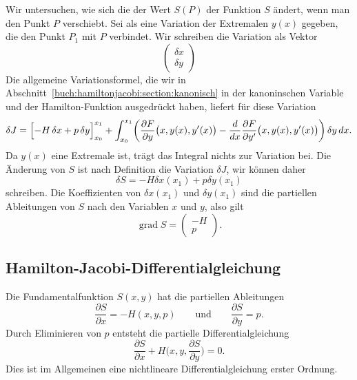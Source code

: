 Wir untersuchen, wie sich die der Wert $S(P)$ der Funktion $S$ ändert,
wenn man den Punkt $P$ verschiebt.
Sei als eine Variation der Extremalen $y(x)$ gegeben, die den Punkt $P_1$
mit $P$ verbindet.
Wir schreiben die Variation als Vektor
\[
\begin{pmatrix}
\delta x\\
\delta y
\end{pmatrix}
\]
Die allgemeine Variationsformel, die wir in 
Abschnitt~\ref{buch:hamiltonjacobi:section:kanonisch}
in der kanoninschen Variable und der Hamilton-Funktion ausgedrückt
haben, liefert für diese Variation
\[
\delta J
=
\Bigl[ -H\,\delta x + p \,\delta y \Bigr]_{x_0}^{x_1}
+
\int_{x_0}^{x_1}
\biggl(
\frac{\partial F}{\partial y}\bigl(x,y(x),y'(x)\bigr)
-
\frac{d}{dx}
\frac{\partial F}{\partial y'}\bigl(x,y(x),y'(x)\bigr)
\biggr)
\,
\delta y
\,dx.
\]
Da $y(x)$ eine Extremale ist, trägt das Integral nichts zur
Variation bei.
Die Änderung von $S$ ist nach Definition die Variation $\delta J$,
wir können daher
\[
\delta S
=
-H\delta x(x_1) + p\delta y(x_1)
\]
schreiben.
Die Koeffizienten von $\delta x(x_1)$ und $\delta y(x_1)$ sind die
partiellen Ableitungen von $S$ nach den Variablen $x$ und $y$, also
gilt
\[
\operatorname{grad} S
=
\begin{pmatrix}
-H\\
p
\end{pmatrix}.
\]

%
%
\subsection{Hamilton-Jacobi-Differentialgleichung
\label{buch:hamiltonjacobi:jacobi:subsection:HJ-DGL}}
Die Fundamentalfunktion $S(x,y)$ hat die partiellen Ableitungen
\begin{equation}
\frac{\partial S}{\partial x}
=
-H(x,y,p)
\qquad\text{und}\qquad
\frac{\partial S}{\partial y}
=
p.
\label{buch:hamiltonjacobi:jacobi:eqn:ableitungen}
\end{equation}
Durch Eliminieren von $p$ entsteht die partielle Differentialgleichung
\begin{equation}
\frac{\partial S}{\partial x}
+
H\biggl(x,y,\frac{\partial S}{\partial y}\biggr) 
=
0.
\label{buch:hamiltonjacobi:jacobi:eqn:hamilton-jacobi-dgl}
\end{equation}
Dies ist im Allgemeinen eine nichtlineare Differentialgleichung
erster Ordnung.

